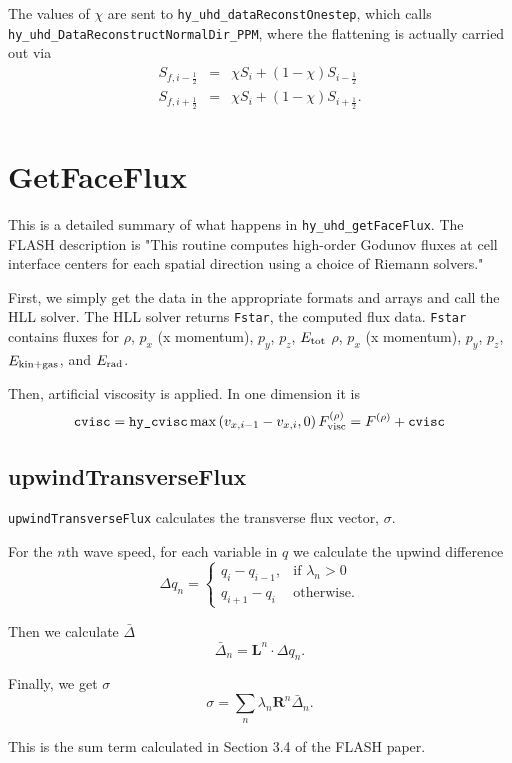 \documentclass[preprint,11pt]{aastex}
\newcommand{\beq}{\begin{equation}}
\newcommand{\eeq}{\end{equation}}
\newcommand{\bea}{\begin{eqnarray}}
\newcommand{\eea}{\end{eqnarray}}
\begin{document}
The values of $\chi$ are sent to \verb!hy_uhd_dataReconstOnestep!, which calls \verb!hy_uhd_DataReconstructNormalDir_PPM!, where the flattening is actually carried out via
\bea
S_{f,i-\frac{1}{2}} &=& \chi S_i + (1 - \chi) S_{i-\frac{1}{2}}  \\
S_{f,i+\frac{1}{2}} &=& \chi S_i + (1 - \chi) S_{i+\frac{1}{2}}. \\
\eea

\section{GetFaceFlux}
\label{sec:getfaceflux}
This is a detailed summary of what happens in \verb!hy_uhd_getFaceFlux!.  The FLASH description is "This routine computes high-order Godunov fluxes at cell interface centers for each spatial direction using a choice of Riemann solvers."

First, we simply get the data in the appropriate formats and arrays and call the HLL solver.  The HLL solver returns \verb!Fstar!, the computed flux data.  \verb!Fstar! contains fluxes for {\color{red}$\rho$, $p_x$ (x momentum), $p_y$, $p_z$, $E_{\rm tot}$} {\color{blue}$\rho$, $p_x$ (x momentum), $p_y$, $p_z$, $E_{\rm kin+gas}$, and $E_{\rm rad}$}.

Then, artificial viscosity is applied.  In one dimension it is
\bea
\verb!cvisc! = \verb!hy_cvisc! \max\left(v_{x,i-1} - v_{x,i},0 \right)
F^{(\rho)}_{\rm visc} = F^{(\rho)} + \verb!cvisc! 
\eea

\subsection{upwindTransverseFlux}
\label{sec:upwindTransverseFlux}
\verb!upwindTransverseFlux! calculates the transverse flux vector, $\sigma$.

For the $n$th wave speed, for each variable in $q$ we calculate the upwind difference
\[
    \Delta q_n = 
\begin{cases}
		q_i - q_{i-1},							& \text{if } \lambda_n > 0 \\
    q_{i+1} - q_i               & \text{otherwise}.
\end{cases}
\]

Then we calculate $\bar{\Delta}$
\beq
\bar{\Delta}_n = \mathbf{L}^n \cdot \Delta q_n.
\eeq

Finally, we get $\sigma$
\beq
\sigma = \sum_n \lambda_n \mathbf{R}^n \bar{\Delta}_n.
\eeq

This is the sum term calculated in Section 3.4 of the FLASH paper.
\end{document}
